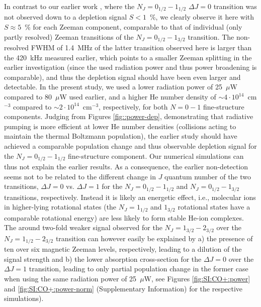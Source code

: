 In contrast to our earlier work \cite{Brunken2017}, where the $N_J=0_{1/2}-1_{1/2}$ $\Delta J=0$ transition was not observed down to a depletion signal $S<1$~\%, we clearly observe it here with $S\approx 5$~\% for each Zeeman component, comparable to that of individual (only partly resolved) Zeeman transitions of the $N_J=0_{1/2}-1_{3/2}$ transition. The non-resolved FWHM of 1.4~MHz of the latter transition observed here is larger than the 420~kHz measured earlier, which points to a smaller Zeeman splitting in the earlier investigation (since the used radiation power and thus power broadening is comparable), and thus the depletion signal should have been even larger and detectable. In the present study, we used a lower radiation power of 25~$\mu$W compared to 80~$\mu$W used earlier, and a higher He number density of $\sim 4\cdot 10^{14}$~cm$^{-3}$ compared to $\sim 2\cdot 10^{14}$~cm$^{-3}$, respectively, for both $N=0-1$ fine-structure components. Judging from Figures \ref{fig::power-dep}, demonstrating that radiative pumping is more efficient at lower He number densities (collisions acting to maintain the thermal Boltzmann population), the earlier study should have achieved a comparable population change and thus observable depletion signal for the $N_J=0_{1/2}-1_{1/2}$ fine-structure component. Our numerical simulations can thus not explain the earlier results.
As a consequence, the earlier non-detection seems not to be related to the different change in $J$ quantum number of the two transitions, $\Delta J=0$ vs. $\Delta J=1$ for the $N_J=0_{1/2}-1_{1/2}$ and $N_J=0_{1/2}-1_{3/2}$ transitions, respectively. Instead it is likely an energetic effect, i.e., molecular ions in higher-lying rotational states (the $N_J=1_{1/2}$ and $1_{3/2}$ rotational states have a comparable rotational energy) are less likely to form stable He-ion complexes. \\

The around two-fold weaker signal observed for the $N_J=1_{3/2}-2_{3/2}$ over the $N_J=1_{1/2}-2_{3/2}$ transition can however easily be explained by a) the presence of ten over six magnetic Zeeman levels, respectively, leading to a dilution of the signal strength and b) the lower absorption cross-section for the $\Delta J=0$ over the $\Delta J=1$ transition, leading to only partial population change in the former case when using the same radiation power of 25~$\mu$W, see Figures \ref{fig:SI:CO+:power} and \ref{fig:SI:CO+:power-norm} (Supplementary Information) for the respective simulations). \\

